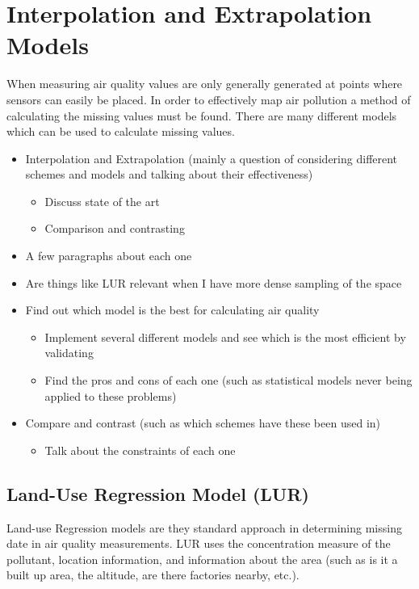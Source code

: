 \section{Interpolation and Extrapolation Models}\label{interpolation}


When measuring air quality values are only generally generated at points where sensors can easily be placed. In order to effectively map air pollution a method of calculating the missing values must be found. There are many different models which can be used to calculate missing values.


	\begin{itemize}
		\item Interpolation and Extrapolation (mainly a question of considering different schemes and models and talking about their effectiveness)
		\begin{itemize}
			\item Discuss state of the art
			\item Comparison and contrasting
		\end{itemize}
	    \item A few paragraphs about each one
	    \item Are things like LUR relevant when I have more dense sampling of the space
	    \item Find out which model is the best for calculating air quality
	    \begin{itemize}
	        \item Implement several different models and see which is the most efficient by validating
	        \item Find the pros and cons of each one (such as statistical models never being applied to these problems)
	    \end{itemize}
	    \item Compare and contrast (such as which schemes have these been used in)
	    \begin{itemize}
	        \item Talk about the constraints of each one
	    \end{itemize}
	\end{itemize}

\subsection{Land-Use Regression Model (LUR)}\label{lur}

Land-use Regression models are they standard approach in determining missing date in air quality measurements. LUR uses the concentration measure of the pollutant, location information, and information about the area (such as is it a built up area, the altitude, are there factories nearby, etc.). 



